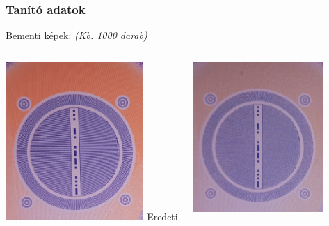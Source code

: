 \documentclass[11pt]{beamer}
\begin{document}
\begin{frame}
	\frametitle{Tanító adatok}
	
	Bementi képek: \textit{(Kb. 1000 darab)}
	\begin{columns}[t]
		
		\begin{column}{.5\textwidth}
			\includegraphics[width=0.8\textwidth, center]{img/eredeti-pelda.png}
			\centering
			Eredeti
		\end{column}
		\begin{column}{.5\textwidth}
			\includegraphics[width=0.8\textwidth, center]{img/copy-pelda.png}
			

\end{column}
\end{columns}
\end{frame}
\end{document}

